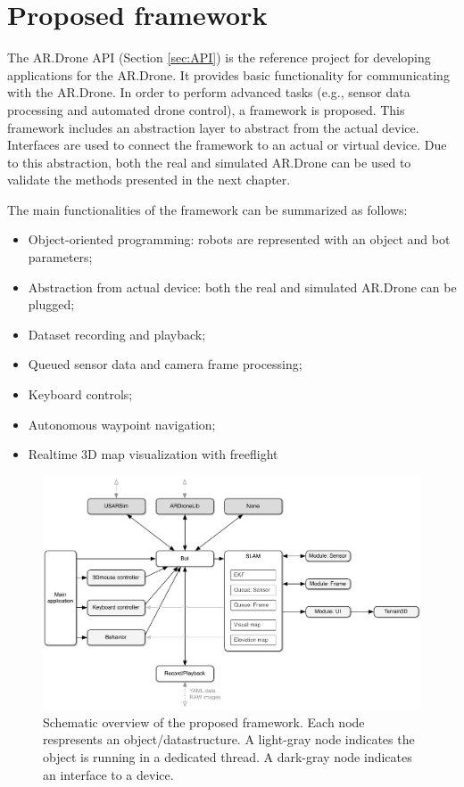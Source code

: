 \section{Proposed framework}
\label{sec:proposed-framework}
The AR.Drone API (Section \ref{sec:API}) is the reference project for developing applications for the AR.Drone.
It provides basic functionality for communicating with the AR.Drone.
In order to perform advanced tasks (e.g., sensor data processing and automated drone control), a framework is proposed.
This framework includes an abstraction layer to abstract from the actual device.
Interfaces are used to connect the framework to an actual or virtual device.
Due to this abstraction, both the real and simulated AR.Drone can be used to validate the methods presented in the next chapter.

The main functionalities of the framework can be summarized as follows:
\begin{itemize}
\item Object-oriented programming: robots are represented with an object and bot parameters;
\item Abstraction from actual device: both the real and simulated AR.Drone can be plugged;
\item Dataset recording and playback;
\item Queued sensor data and camera frame processing;
\item Keyboard controls;
\item Autonomous waypoint navigation;
\item Realtime 3D map visualization with freeflight
\end{itemize}

\begin{figure}[htb!]
\centering
\includegraphics[width=\linewidth]{images/framework.pdf}
\caption{Schematic overview of the proposed framework. Each node respresents an object/datastructure. A light-gray node indicates the object is running in a dedicated thread. A dark-gray node indicates an interface to a device.} 
\label{fig:proposed_framework_schematic}
\end{figure}

